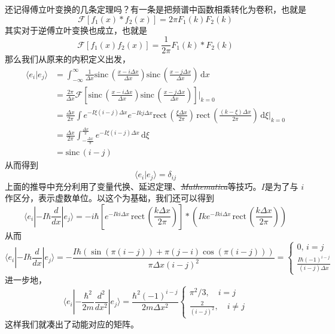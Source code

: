 \documentclass[12pt,a4paper,openany,twoside]{book}
\numberwithin{equation}{section}
\newcommand{\sinc}[1]{\mathrm{sinc} \, (#1)}
\begin{document}
      还记得傅立叶变换的几条定理吗？有一条是把频谱中函数相乘转化为卷积，也就是
      \begin{equation}
      	\mathcal{F}[f_1(x) * f_2(x)] = 2\pi F_1(k) F_2(k) 
      \end{equation}
      其实对于逆傅立叶变换也成立，也就是
      \begin{equation}
      	\mathcal{F}[f_1(x) f_2(x)] = \frac{1}{2\pi} F_1(k) * F_2(k) 
      \end{equation}
      那么我们从原来的内积定义出发，
      \begin{align*}
      	\langle e_i | e_j \rangle &= \int _{-\infty}^\infty \frac{1}{\Delta x} \sinc{\frac{x- i \Delta x}{\Delta x}} \sinc{\frac{x- j \Delta x}{\Delta x}} \, \mathrm{d}x\\ 
      				   &= \frac{2\pi}{\Delta x} \mathcal{F}[\sinc{\frac{x - i\Delta x}{\Delta x}} \sinc{\frac{x- j \Delta x}{\Delta x}}] \bigg|_{k=0} \\
      				   &= \frac{\Delta x}{2\pi} \int e^{- I \xi (i-j) \Delta x} e^{-I k j \Delta x}\mathrm{rect}\, \left( \frac{\xi \Delta x}{2 \pi} \right)  \, \mathrm{rect} \, \left( \frac{(k-\xi) \Delta x}{2 \pi} \right) \, \mathrm{d} \xi \bigg|_{k=0} \\
      				   &= \frac{\Delta x}{2 \pi} \int _{-\frac{\Delta x}{\pi}} ^{\frac{\Delta x}{\pi}} e^{-I \xi (i-j) \Delta x}  \, \mathrm{d} \xi \\
      				   &= \sinc{i-j} 
      \end{align*}
      从而得到
      \begin{equation}
      	\langle e_i | e_j \rangle = \delta_{ij}
      \end{equation}
      上面的推导中充分利用了变量代换、延迟定理、\sout{\emph{Mathematica}}等技巧。$I$是为了与 $i$作区分，表示虚数单位。以这个为基础，我们还可以得到
      \begin{equation*}
      	\langle e_i | - I \hbar \frac{d}{dx} | e_j \rangle = -i\hbar \left[ e^{-I k i \Delta x} \,\mathrm{rect}\, \left( \frac{k \Delta x}{2 \pi} \right)  \right] * \left( I k e^{- I k i \Delta x} \, \mathrm{rect} \, \left( \frac{k \Delta x }{ 2 \pi} \right)  \right) 
      \end{equation*}
      从而
      \begin{equation}
      	 \langle e_i | - I \hbar \frac{d}{dx} | e_j \rangle = -\frac{I \hbar (\sin (\pi  (i-j))+\pi  (j-i) \cos (\pi  (i-j)))}{\pi \Delta
         x (i-j)^2} = 
        \begin{cases}
         	0, \, i=j \\
      	\frac{I\hbar (-1)^{i-j}}{(i-j) \Delta x}
        \end{cases}
      \end{equation}
      进一步地，
      \begin{equation}
       	\langle e_i | -\frac{\hbar ^2}{2m} \frac{d^2}{dx ^2} | e_j \rangle = \frac{\hbar^{2}(-1)^{i-j}}{2 m \Delta x^{2}} \begin{cases}{\pi^{2} / 3,} \quad {i=j} \\ {\frac{2}{\left(i-j\right)^{2}},} \quad {i \neq j}\end{cases}
      \end{equation}
      这样我们就凑出了动能对应的矩阵。
\end{document}
